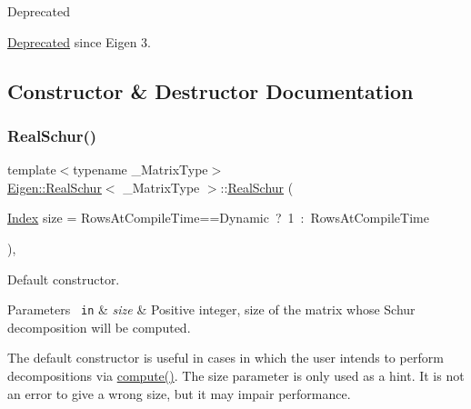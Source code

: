 \begin{DoxyRefDesc}{Deprecated}
\item[\mbox{\hyperlink{deprecated__deprecated000022}{Deprecated}}]since Eigen 3. \end{DoxyRefDesc}


\subsection{Constructor \& Destructor Documentation}
\mbox{\label{class_eigen_1_1_real_schur_a826c83e2f1d4c8332606a14ea121ff5f}} 
\subsubsection{\texorpdfstring{RealSchur()}{RealSchur()}\hspace{0.1cm}{\footnotesize\ttfamily [1/2]}}
{\footnotesize\ttfamily template$<$typename \+\_\+\+Matrix\+Type$>$ \\
\mbox{\hyperlink{class_eigen_1_1_real_schur}{Eigen\+::\+Real\+Schur}}$<$ \+\_\+\+Matrix\+Type $>$\+::\mbox{\hyperlink{class_eigen_1_1_real_schur}{Real\+Schur}} (\begin{DoxyParamCaption}\item[{\mbox{\hyperlink{class_eigen_1_1_real_schur_a8bd4653e2d9569a44ecc95e746422d3f}{Index}}}]{size = {\ttfamily RowsAtCompileTime==Dynamic~?~1~\+:~RowsAtCompileTime} }\end{DoxyParamCaption})\hspace{0.3cm}{\ttfamily [inline]}, {\ttfamily [explicit]}}



Default constructor. 


\begin{DoxyParams}[1]{Parameters}
\mbox{\texttt{ in}}  & {\em size} & Positive integer, size of the matrix whose Schur decomposition will be computed.\\
\hline
\end{DoxyParams}
The default constructor is useful in cases in which the user intends to perform decompositions via \mbox{\hyperlink{class_eigen_1_1_real_schur_a60caf9ffad11d728ea458c4dd36d0a98}{compute()}}. The {\ttfamily size} parameter is only used as a hint. It is not an error to give a wrong {\ttfamily size}, but it may impair performance.

